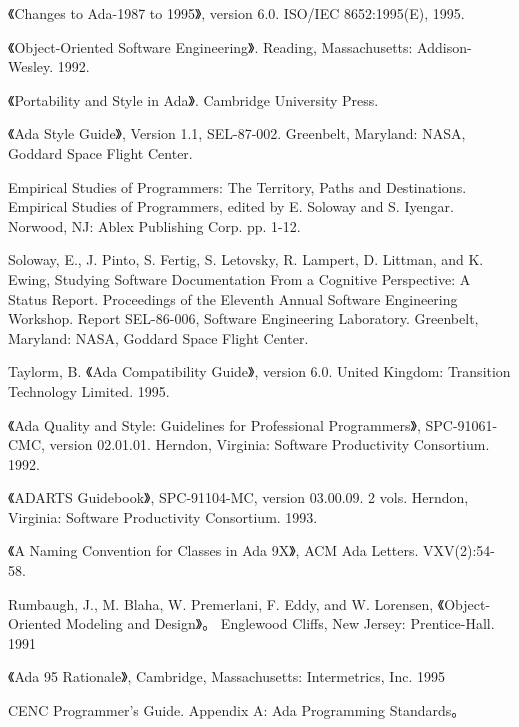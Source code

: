 \begin{thebibliography}{widest-label}
 《Changes to Ada-1987 to 1995》,
version 6.0. ISO/IEC 8652:1995(E), 1995.

 《Object-Oriented Software
Engineering》. Reading, Massachusetts: Addison-Wesley. 1992.


 《Portability and Style in Ada》.
Cambridge University Press.

 《Ada Style Guide》, Version 1.1, SEL-87-002.
Greenbelt, Maryland: NASA, Goddard Space Flight Center.

 Empirical Studies of Programmers:
The Territory, Paths and Destinations. Empirical Studies of Programmers, edited by E. Soloway and S. Iyengar. Norwood, NJ: Ablex Publishing Corp. pp. 1-12.

 Soloway, E., J. Pinto, S. Fertig, S. Letovsky, R. Lampert, D. Littman, and K. Ewing,
Studying Software Documentation From a Cognitive Perspective: A Status Report. Proceedings of the Eleventh Annual Software Engineering Workshop. Report SEL-86-006, Software Engineering Laboratory. Greenbelt, Maryland: NASA, Goddard Space Flight Center. 

 Taylorm, B.
《Ada Compatibility Guide》, version 6.0. United Kingdom:
Transition Technology Limited. 1995.


 《Ada Quality and Style: Guidelines
for Professional Programmers》, SPC-91061-CMC, version 02.01.01.
Herndon, Virginia: Software Productivity Consortium. 1992.

 《ADARTS Guidebook》, SPC-91104-MC,
version 03.00.09. 2 vols. Herndon, Virginia: Software Productivity Consortium.
1993.

 《A Naming Convention for Classes in Ada 9X》, ACM Ada Letters. VXV(2):54-58.

 Rumbaugh, J., M. Blaha, W. Premerlani, F. Eddy, and W. Lorensen, 《Object-Oriented Modeling and Design》。
Englewood Cliffs, New Jersey: Prentice-Hall. 1991

 《Ada 95 Rationale》, Cambridge,
Massachusetts: Intermetrics, Inc. 1995

 CENC Programmer's Guide. Appendix A: Ada Programming Standards。

\end{thebibliography}
